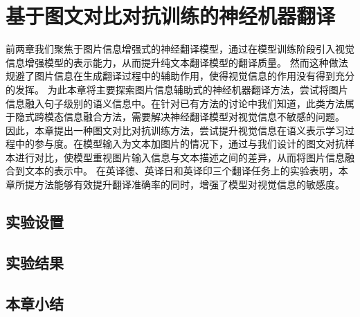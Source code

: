 \chapter{基于图文对比对抗训练的神经机器翻译}
前两章我们聚焦于图片信息增强式的神经翻译模型，通过在模型训练阶段引入视觉信息增强模型的表示能力，从而提升纯文本翻译模型的翻译质量。
然而这种做法规避了图片信息在生成翻译过程中的辅助作用，使得视觉信息的作用没有得到充分的发挥。
为此本章将主要探索图片信息辅助式的神经机器翻译方法，尝试将图片信息融入句子级别的语义信息中。在针对已有方法的讨论中我们知道，此类方法属于隐式跨模态信息融合方法，需要解决神经翻译模型对视觉信息不敏感的问题。
因此，本章提出一种图文对比对抗训练方法，尝试提升视觉信息在语义表示学习过程中的参与度。在模型输入为文本加图片的情况下，通过与我们设计的图文对抗样本进行对比，使模型重视图片输入信息与文本描述之间的差异，从而将图片信息融合到文本的表示中。
在英译德、英译日和英译印三个翻译任务上的实验表明，本章所提方法能够有效提升翻译准确率的同时，增强了模型对视觉信息的敏感度。






\section{实验设置}

\section{实验结果}

\section{本章小结}

